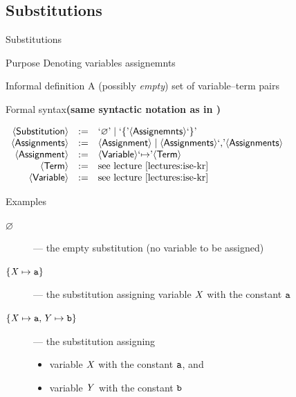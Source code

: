 \documentclass[presentation]{beamer}\mode<presentation>{\usetheme{AMSBolognaFC}}
\begin{document}
\subsection{Substitutions}

\begin{frame}[allowframebreaks]{Substitutions}
    \begin{block}{Purpose}\centering
        Denoting variables assignemnts
    \end{block}
    \begin{block}{Informal definition}
        A (possibly \emph{empty}) set of \alert{variable--term} pairs
    \end{block}
    \begin{alertblock}{Formal syntax\hfill\textbf{\footnotesize(same syntactic notation as in \cite{lectures:ise-kr})}}
        \begin{center}
            $\begin{array}{rcl}
                \mathsf{\left\langle Substitution\right\rangle} & := & \text{`}\mathit{\varnothing}\text{'} \mid \text{`}\mathit{\{}\text{'} \mathsf{\left\langle Assignemnts\right\rangle} \text{`}\mathit{\}}\text{'}
                \\
                \mathsf{\left\langle Assignments\right\rangle} & := & \mathsf{\left\langle Assignment\right\rangle} \mid \mathsf{\left\langle Assignments\right\rangle} \text{`}\mathit{,}\text{'} \mathsf{\left\langle Assignments\right\rangle}
                \\
                \mathsf{\left\langle Assignment\right\rangle} & := & \mathsf{\left\langle Variable\right\rangle} \text{`}\mathit{\mapsto}\text{'} \mathsf{\left\langle Term\right\rangle}
                \\
                \mathsf{\left\langle Term\right\rangle} & := & \text{see lecture \cite{lectures:ise-kr}}
				\\
                \mathsf{\left\langle Variable\right\rangle} & := & \text{see lecture \cite{lectures:ise-kr}}
			\end{array}$
        \end{center}
    \end{alertblock}

    \begin{exampleblock}{Examples}
        \begin{description}
            \item[$\varnothing$] --- the empty substitution (no variable to be assigned)
            \item[$\{ \mathit{X} \mapsto \mathtt{a} \}$] --- the substitution assigning variable $\mathit{X}$ with the constant $\mathtt{a}$
            \item[$\{ \mathit{X} \mapsto \mathtt{a}, \mathit{Y} \mapsto \mathtt{b} \}$] --- the substitution assigning 
			\begin{itemize}
				\item variable $\mathit{X}$ with the constant $\mathtt{a}$, and
				\item variable $\mathit{Y}$ with the constant $\mathtt{b}$ 
			\end{itemize} 
        \end{description}
    \end{exampleblock}
\end{frame}
\end{document}
